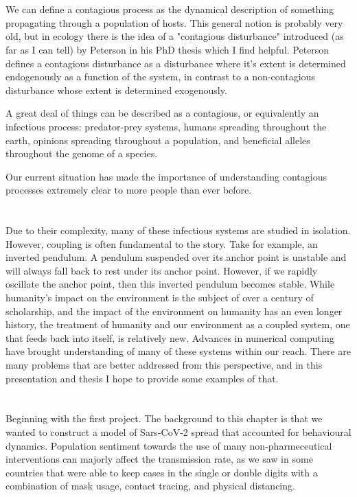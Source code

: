 \documentclass{article}
\begin{document}
\section{}

We can define a contagious process as the dynamical description of something propagating through a population of hosts. This general notion is probably very old, but in ecology there is the idea of a "contagious disturbance" introduced (as far as I can tell) by Peterson in his PhD thesis which I find helpful. Peterson defines a contagious disturbance as a disturbance where it's extent is determined endogenously as a function of the system, in contrast to a non-contagious disturbance whose extent is determined exogenously.

A great deal of things can be described as a contagious, or equivalently an infectious process: predator-prey systems, humans spreading throughout the earth, opinions spreading throughout a population, and beneficial alleles throughout the genome of a species.

Our current situation has made the importance of understanding contagious processes extremely clear to more people than ever before.

\section{}
Due to their complexity, many of these infectious systems are studied in isolation. However, coupling is often fundamental to the story. Take for example, an  inverted pendulum. A pendulum suspended over its anchor point is unstable and will always fall back to rest under its anchor point. However, if we rapidly oscillate the anchor point, then this inverted pendulum becomes stable. While humanity's impact on the environment is the subject of over a century of scholarship, and the impact of the environment on humanity has an even longer history, the treatment of humanity and our environment as a coupled system, one that feeds back into itself, is relatively new. Advances in numerical computing have brought understanding of many of these systems within our reach. There are many problems that are better addressed from this perspective, and in this presentation and thesis I hope to provide some examples of that. 

\section{}
Beginning with the first project. The background to this chapter is that we wanted to construct a model of Sars-CoV-2 spread that accounted for behavioural dynamics. Population sentiment towards the use of many non-pharmeceutical interventions can majorly affect the transmission rate, as we saw in some countries that were able to keep cases in the single or double digits with a combination of mask usage, contact tracing, and physical distancing.
\end{document}
